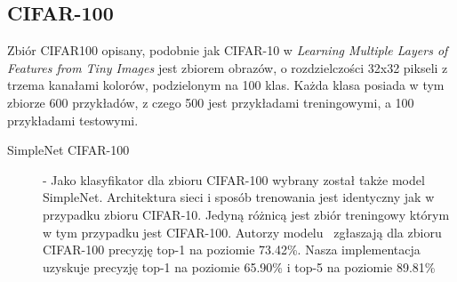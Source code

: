 \documentclass[
    left=2.5cm,         %
    right=2.5cm,        %
    top=2.5cm,          %
    bottom=3cm,         %
    bindingoffset=6mm,  %
    nohyphenation=false %
]{eiti/eiti-thesis}
\begin{document}
\subsection{CIFAR-100}
    Zbiór CIFAR100 opisany, podobnie jak CIFAR-10 w  \textit{Learning Multiple Layers of Features from Tiny Images} \cite{Krizhevsky2009LearningML}
    jest zbiorem obrazów, o rozdzielczości 32x32 pikseli z trzema kanałami kolorów, podzielonym na 100 klas.
    Każda klasa posiada w tym zbiorze 600 przykładów, z czego 500 jest przykładami treningowymi, a 100 przykładami testowymi.
\begin{description}
    \item[SimpleNet CIFAR-100]\label{SimpleNetCIFAR-100}
         - Jako klasyfikator dla zbioru CIFAR-100 wybrany został także model SimpleNet. Architektura sieci i sposób trenowania
        jest identyczny jak w przypadku zbioru CIFAR-10. Jedyną różnicą jest zbiór treningowy którym w tym przypadku jest CIFAR-100.
        Autorzy modelu~\cite{DBLP:journals/corr/HasanPourRVS16} zgłaszają dla zbioru CIFAR-100 precyzję top-1 na poziomie 73.42\%.
        Nasza implementacja uzyskuje precyzję top-1 na poziomie 65.90\% i top-5 na poziomie 89.81\%
\end{description}
\end{document}
